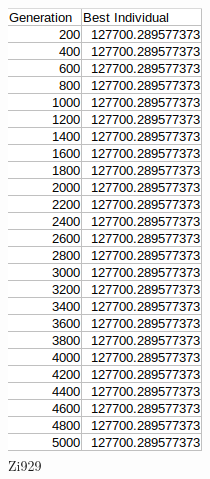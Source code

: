 \documentclass[11pt,a4paper,titlepage]{article}
\begin{document}
\begin{figure}[ht]
\begin{subfigure}{.32\textwidth}
	\end{subfigure}
	\begin{subfigure}{.32\textwidth}
		\centering		
		\includegraphics[width=.75\textwidth]{MultZi929}
		\caption{Zi929}
	\end{subfigure}	
	\begin{subfigure}{.32\textwidth}
		\centering

\end{subfigure}
\end{figure}
\end{document}
